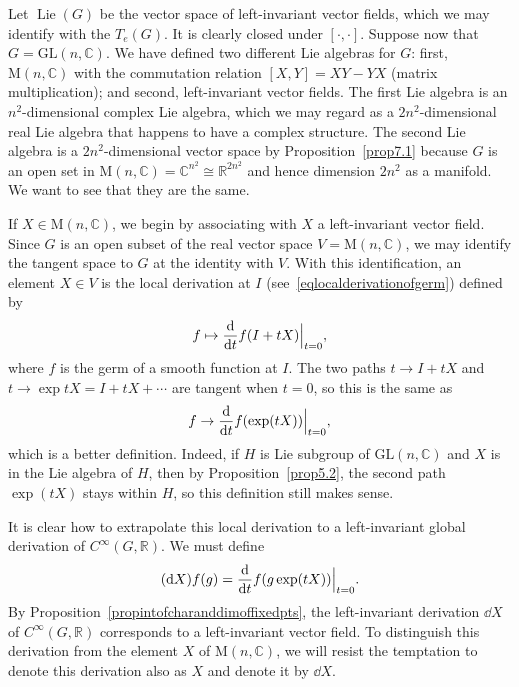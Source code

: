 \documentclass[12pt,reqno]{book}%
\theoremstyle{definition}
\theoremstyle{remark}
\theoremstyle{theorem}
\theoremstyle{remark}
\renewcommand{\d}{\dd}
\begin{document}
Let $\operatorname{Lie}(G)$ be the vector space of left-invariant vector fields, which we may identify with the $T_e(G)$.
It is clearly closed under $[\cdot, \cdot ]$.
Suppose now that $G = \mathrm{GL}(n, \mathbb{C})$.
We have defined two different Lie algebras for $G$: first, $\mathrm{M}(n, \mathbb{C})$ with the commutation relation $[X, Y] = XY - YX$ (matrix multiplication); and second, left-invariant vector fields.
The first Lie algebra is an $n^2$-dimensional complex Lie algebra, which we may regard as a $2n^2$-dimensional real Lie algebra that happens to have a complex structure.
The second Lie algebra is a $2n^2$-dimensional vector space by Proposition~\ref{prop7.1} because $G$ is an open set in $\mathrm{M}(n, \mathbb{C}) = \mathbb{C}^{n^2} \cong \mathbb{R}^{2n^2}$ and hence dimension $2n^2$ as a manifold.
We want to see that they are the same.

If $X \in \mathrm{M}(n, \mathbb{C})$, we begin by associating with $X$ a left-invariant vector field.
Since $G$ is an open subset of the real vector space $V = \mathrm{M}(n, \mathbb{C})$, we may identify the tangent space to $G$ at the identity with $V$.
With this identification, an element $X \in V$ is the local derivation at $I$ (see~\eqref{eqlocalderivationofgerm}) defined by
\[
    f \mapsto \dv{t}f(I + tX)\Big|_{t = 0},
\]
where $f$ is the germ of a smooth function at $I$.
The two paths $t \to I + tX$ and $t \to \exp{tX} = I + tX + \cdots $ are tangent when $t = 0$, so this is the same as
\[
    f \to \dv{t}f(\exp(tX))\Big|_{t = 0},
\]
which is a better definition.
Indeed, if $H$ is Lie subgroup of $\mathrm{GL}(n, \mathbb{C})$ and $X$ is in the Lie algebra of $H$, then by Proposition~\ref{prop5.2}, the second path $\exp(tX)$ stays within $H$, so this definition still makes sense.

It is clear how to extrapolate this local derivation to a left-invariant global derivation of $C^\infty(G, \mathbb{R})$.
We must define
\begin{equation}\label{eq7.1}
    (\d{X})f(g) = \dv{t}f(g\exp(tX))\Big|_{t = 0}.
\end{equation}
By Proposition~\ref{propintofcharanddimoffixedpts}, the left-invariant derivation $\d{X}$ of $C^\infty(G, \mathbb{R})$ corresponds to a left-invariant vector field.
To distinguish this derivation from the element $X$ of $\mathrm{M}(n, \mathbb{C})$, we will resist the temptation to denote this derivation also as $X$ and denote it by $\d{X}$.
\end{document}
